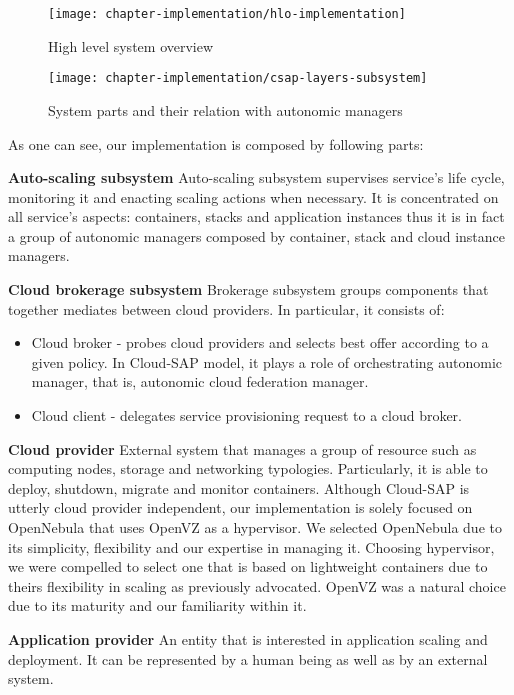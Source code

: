 \begin{figure}[!ht]
  \begin{center}
    \texttt{[image: chapter-implementation/hlo-implementation]}
  \end{center}
  \caption{High level system overview}
  \label{fig:hlo-implementation}
\end{figure}

\begin{figure}[!ht]
  \begin{center}
    \texttt{[image: chapter-implementation/csap-layers-subsystem]}
  \end{center}
  \caption{System parts and their relation with autonomic managers}
  \label{fig:csap-layers-subsystem}
\end{figure}

As one can see, our implementation is composed by following parts:
\begin{asparaenum}
 \item[\textbf{Auto-scaling subsystem}] Auto-scaling subsystem supervises service's life cycle, monitoring it and enacting scaling actions when necessary. It is concentrated on all service's aspects: containers, stacks and application instances thus it is in fact a group of autonomic managers composed by container, stack and cloud instance managers.

 \item[\textbf{Cloud brokerage subsystem}] Brokerage subsystem groups components that together mediates between cloud providers. In particular, it consists of:
  \begin{itemize}
   \item Cloud broker - probes cloud providers and selects best offer according to a given policy. In Cloud-SAP model, it plays a role of orchestrating autonomic manager, that is, autonomic cloud federation manager.
   \item Cloud client - delegates service provisioning request to a cloud broker.
  \end{itemize}
 
 \item[\textbf{Cloud provider}] External system that manages a group of resource such as computing nodes, storage and networking typologies. Particularly, it is able to deploy, shutdown, migrate and monitor containers. Although Cloud-SAP is utterly cloud provider independent, our implementation is solely focused on OpenNebula that uses OpenVZ as a hypervisor. We selected OpenNebula due to its simplicity, flexibility and our expertise in managing it. Choosing hypervisor, we were compelled to select one that is based on lightweight containers due to theirs flexibility in scaling as previously advocated. OpenVZ was a natural choice due to its maturity and our familiarity within it.
 
 \item[\textbf{Application provider}] An entity that is interested in application scaling and deployment. It can be represented by a human being as well as by an external system.
\end{asparaenum}

